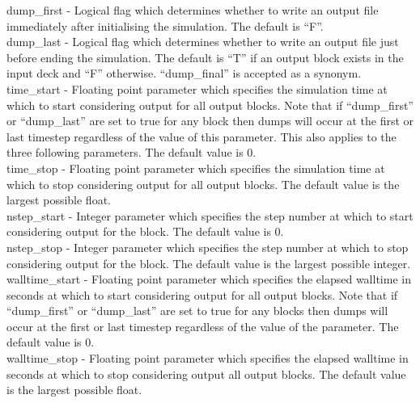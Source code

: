 {\emphtext dump\_first} - Logical flag which determines whether to write an
  output file immediately after initialising the simulation. The default is
  ``F''.\\

{\emphtext dump\_last} - Logical flag which determines whether to write an
  output file just before ending the simulation. The default is ``T'' if
  an output block exists in the input deck and ``F'' otherwise.
  ``dump\_final'' is accepted as a synonym.\\

{\emphtext time\_start} - Floating point parameter which specifies the
  simulation time at which to start considering output for all output
  blocks. Note
  that if ``dump\_first'' or ``dump\_last'' are set to true for any block then
  dumps will occur at the first or last timestep regardless of the value of this
  parameter. This also applies to the three following parameters.
  The default value is 0.\\

{\emphtext time\_stop} - Floating point parameter which specifies the
  simulation time at which to stop considering output for all output blocks.
  The default value is the largest possible float.\\

{\emphtext nstep\_start} - Integer parameter which specifies the
  step number at which to start considering output for the block.
  The default value is 0.\\

{\emphtext nstep\_stop} - Integer parameter which specifies the
  step number at which to stop considering output for the block.
  The default value is the largest possible integer.\\

{\emphtext walltime\_start} - Floating point parameter which specifies the
  elapsed walltime in seconds at which to start considering output for all
  output blocks. Note
  that if ``dump\_first'' or ``dump\_last'' are set to true for any blocks then
  dumps will occur at the first or last timestep regardless of the value of
  the 
  parameter.
  The default value is 0.\\

{\emphtext walltime\_stop} - Floating point parameter which specifies the
  elapsed walltime in seconds at which to stop considering output all
  output blocks. The default value is the largest possible float.\\

